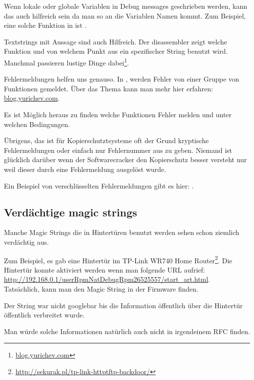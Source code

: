 Wenn lokale oder globale Variablen in Debug messages geschrieben werden, kann das auch 
hilfreich sein da man so an die Variablen Namen kommt.
Zum Beispiel, eine solche Funktion in \oracle ist .

Textstrings mit Aussage sind auch Hilfreich.
Der \IDA disassembler zeigt welche Funktion und von welchem Punkt aus ein spezifischer String benutzt wird.
Manchmal passieren lustige Dinge dabei\footnote{\href{http://go.yurichev.com/17223}{blog.yurichev.com}}.

Fehlermeldungen helfen uns genauso.
In \oracle, werden Fehler von einer Gruppe von Funktionen gemeldet.
\"Uber das Thema kann man mehr hier erfahren: \href{http://go.yurichev.com/17224}{blog.yurichev.com}.


Es ist M\"oglich heraus zu finden welche Funktionen Fehler melden und unter welchen Bedingungen.


\"Ubrigens, das ist f\"ur Kopierschutztsysteme oft der Grund kryptische Fehlermeldungen oder einfach nur 
Fehlernummer aus zu geben. Niemand ist gl\"ucklich dar\"uber wenn der Softwarecracker den Kopierschutz besser
versteht nur weil dieser durch eine Fehlermeldung ausgel\"ost wurde.

Ein Beispiel von verschl\"usselten Fehlermeldungen gibt es hier: .

\subsection{Verd\"achtige magic strings}

Manche Magic Strings die in Hintert\"uren benutzt werden sehen schon ziemlich verd\"achtig aus.

Zum Beispiel, es gab eine Hintert\"ur im TP-Link WR740 Home Router\footnote{\url{http://sekurak.pl/tp-link-httptftp-backdoor/}}.
Die Hintert\"ur konnte aktiviert werden wenn man folgende URL aufrief:
\url{http://192.168.0.1/userRpmNatDebugRpm26525557/start_art.html}.\\

Tats\"achlich, kann man den Magic String  in der Firmware finden.

Der String war nicht googlebar bis die Information \"offentlich \"uber die Hintert\"ur \"offentlich verbreitet wurde.


Man w\"urde solche Informationen nat\"urlich auch nicht in irgendeinem \ac{RFC} finden.


